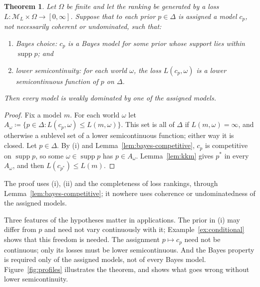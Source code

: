 \documentclass[11pt]{article}
\newtheorem{theorem}{Theorem}[section]
\theoremstyle{definition}
\theoremstyle{remark}
\newcommand{\M}{\mathcal M}
\newcommand{\supp}{\operatorname{supp}}
\begin{document}
\begin{theorem}\label{thm:bayes-finite}
Let $\Omega$ be finite and let the ranking be generated by a loss $L:\M_L\times\Omega\to[0,\infty]$. Suppose that to each prior $p\in\Delta$ is assigned a model $c_p$, not necessarily coherent or undominated, such that:
\begin{enumerate}[label=(\roman*)]
\item \emph{Bayes choice}: $c_p$ is a Bayes model for some prior whose support lies within $\supp p$; and
\item \emph{lower semicontinuity}: for each world $\omega$, the loss $L(c_p,\omega)$ is a lower semicontinuous function of $p$ on $\Delta$.
\end{enumerate}
Then every model is weakly dominated by one of the assigned models.
\end{theorem}
\begin{proof}
Fix a model $m$. For each world $\omega$ let $A_\omega\coloneqq\{p\in\Delta:L(c_p,\omega)\le L(m,\omega)\}$. This set is all of $\Delta$ if $L(m,\omega)=\infty$, and otherwise a sublevel set of a lower semicontinuous function; either way it is closed. Let $p\in\Delta$. By (i) and Lemma~\ref{lem:bayes-competitive}, $c_p$ is competitive on $\supp p$, so some $\omega\in\supp p$ has $p\in A_\omega$. Lemma~\ref{lem:kkm} gives $p^*$ in every $A_\omega$, and then $L(c_{p^*})\le L(m)$.
\end{proof}
The proof uses (i), (ii) and the completeness of loss rankings, through Lemma~\ref{lem:bayes-competitive}; it nowhere uses coherence or undominatedness of the assigned models.

Three features of the hypotheses matter in applications. The prior in (i) may differ from $p$ and need not vary continuously with it; Example~\ref{ex:conditional} shows that this freedom is needed. The assignment $p\mapsto c_p$ need not be continuous; only its losses must be lower semicontinuous. And the Bayes property is required only of the assigned models, not of every Bayes model. Figure~\ref{fig:profiles} illustrates the theorem, and shows what goes wrong without lower semicontinuity.
\end{document}
